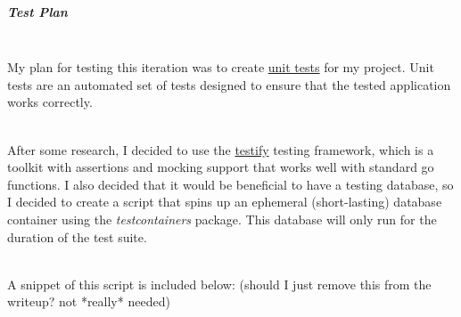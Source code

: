 \documentclass[../../main.tex]{subfiles}
\begin{document}
\subparagraph{Test Plan}

\noindent \\ My plan for testing this iteration was to create \underline{unit tests} for my project. Unit tests are an automated set of tests designed to ensure that the tested application works correctly.

\noindent \\ After some research, I decided to use the \underline{testify} testing framework, which is a toolkit with assertions and mocking support that works well with standard go functions.
I also decided that it would be beneficial to have a testing database, so I decided to create a script that spins up an ephemeral (short-lasting) database container using the \textit{testcontainers} package. This database will only run for the duration of the test suite.

\noindent \\ A snippet of this script is included below: (should I just remove this from the writeup? not *really* needed)
\end{document}
